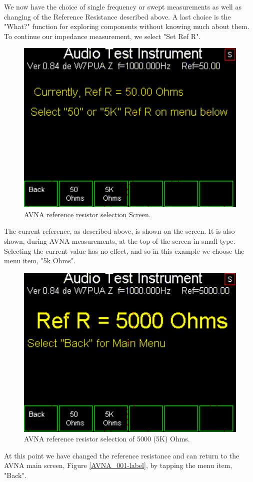 %
We now have the choice  of single frequency or swept measurements as well as changing of the Reference Resistance described above. A last choice is the "\textsf{What?}" function for exploring components without knowing much about them. To continue our impedance measurement, we select "\textsf{Set Ref R}".
\begin{figure}[H]
\begin{center}
\includegraphics[scale=0.75]{./images/AVNA_003.pdf}
\caption{AVNA reference resistor selection  Screen.}
\label{AVNA_003-label}
\end{center}
\end{figure}
%
The current reference, as described above, is shown on the screen. It is also shown, during AVNA measurements, at the top of the screen in small type. Selecting the current value has no effect, and so in this example we choose the menu item, "\textsf{5k Ohms}".
\begin{figure}[H]
\begin{center}
\includegraphics[scale=0.75]{./images/AVNA_004.pdf}
\caption{AVNA reference resistor selection of 5000 (5K) Ohms.}
\label{AVNA_004-label}
\end{center}
\end{figure}
At this point we have changed the reference resistance and can return to the AVNA main screen, Figure \ref{AVNA_001-label}, by tapping the menu item, "\textsf{Back}".

